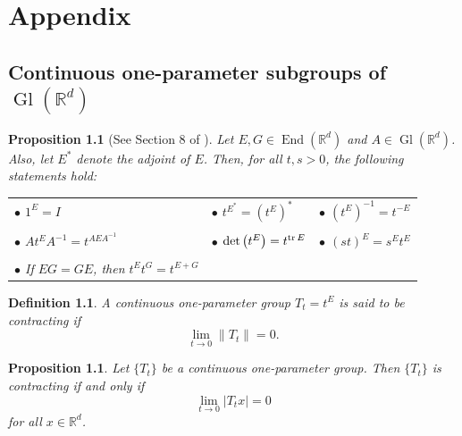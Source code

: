 \documentclass[11pt, letter]{book}
\newtheorem{definition}[theorem]{Definition}
\newtheorem{proposition}[theorem]{Proposition}
\newcommand\End{\operatorname{End}} %
\newcommand\Gl{\operatorname{Gl}} %
\renewcommand\det{\operatorname{det}}
\begin{document}




\chapter{Appendix}\label{chap:Appendix}



\section{Continuous one-parameter subgroups of $\Gl(\mathbb{R}^d)$}\label{sec:OneParameterGroups}

\begin{proposition}[See Section 8 of \cite{randles_convolution_2017}]\label{prop:ContinuousGroupProperties}
Let $E,G\in\End(\mathbb{R}^d)$ and $A\in\Gl(\mathbb{R}^d)$. Also, let $E^*$ denote the adjoint of $E$. Then, for all $t,s>0$, the following statements hold:

\vspace{.3cm}
\begin{tabular}{lll}
$\bullet$ $1^E=I$ &  $\bullet$ $t^{E^*}=(t^E)^*$ & $\bullet$ $(t^E)^{-1}=t^{-E}$ 
\\
\vspace{.1cm}\\
$\bullet$ $At^EA^{-1}=t^{AEA^{-1}}$ &  $\bullet$ $\det\left(t^E\right)=t^{\tr E}$ & $\bullet$ $(st)^E=s^Et^E$\\
\vspace{.1cm}\\
$\bullet$ If $EG=GE$, then $t^Et^G=t^{E+G}$ &&
\end{tabular}
\end{proposition}

\begin{definition} A continuous one-parameter group $T_t=t^E$ is said to be \textit{contracting} if
\begin{equation*}
\lim_{t\to 0}\|T_t\|=0. 
\end{equation*}
\end{definition}

\begin{proposition}
Let $\{T_t\}$ be a continuous one-parameter group. Then $\{T_t\}$ is contracting if and only if
\begin{equation}\label{eq:ContractingSufficient}
\lim_{t\to 0}|T_tx|=0
\end{equation}
for all $x\in\mathbb{R}^d$.
\end{proposition}
\end{document}
